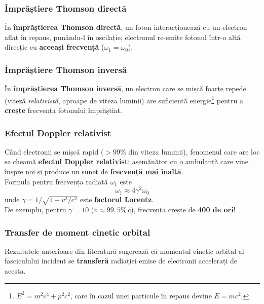 \begin{frame}
  \frametitle{Împrăștiere Thomson directă}

  În \textbf{împrăștierea Thomson directă}, un foton interacționează cu un electron aflat în repaus, punându-l în oscilație; electronul re-emite fotonul într-o altă direcție cu \textbf{aceeași frecvență} (\(\omega_1 = \omega_0\)).

  \vspace{0.35cm}
  \begin{center}
  \end{center}
\end{frame}

\begin{frame}
  \frametitle{Împrăștiere Thomson inversă}

  În \textbf{împrăștierea Thomson inversă}, un electron care se mișcă foarte repede (viteză \emph{relativistă}, aproape de viteza luminii) are suficientă energie\footnote{\(E^2 = m^2 c^4 + p^2 c^2\), care în cazul unei particule în repaus devine \(E = mc^2\).} pentru a \textbf{crește} frecvența fotonului împrăștiat.

  \vspace{0.3cm}
  \begin{center}
  \end{center}
\end{frame}

\begin{frame}
  \frametitle{Efectul Doppler relativist}

  Când electronii se mișcă rapid (\(> 99\%\) din viteza luminii), fenomenul care are loc se cheamă \textbf{efectul Doppler relativist}: asemănător cu o ambulanță care vine înspre noi și produce un sunet de \textbf{frecvență mai înaltă}. \\[0.8em]

  Formula pentru frecvența radiată \(\omega_1\) este
  \[
    \omega_1 \approx 4 \gamma^2 \omega_0
  \]
  unde \(\gamma = 1/\sqrt{1 - v^2/c^2}\) este \textbf{factorul Lorentz}. \\[0.6em]

  De exemplu, pentru \(\gamma = 10\) (\(v \approx 99{,}5\%\,c\)), frecvența crește de \textbf{400 de ori}!
\end{frame}

\begin{frame}
  \frametitle{Transfer de moment cinetic orbital}

  Rezultatele anterioare din literatură \cite{Taira2018,Hu2021,Chen2022} sugerează că momentul cinetic orbital al fasciculului incident se \textbf{transferă} radiației emise de electronii accelerați de acesta.
\end{frame}

